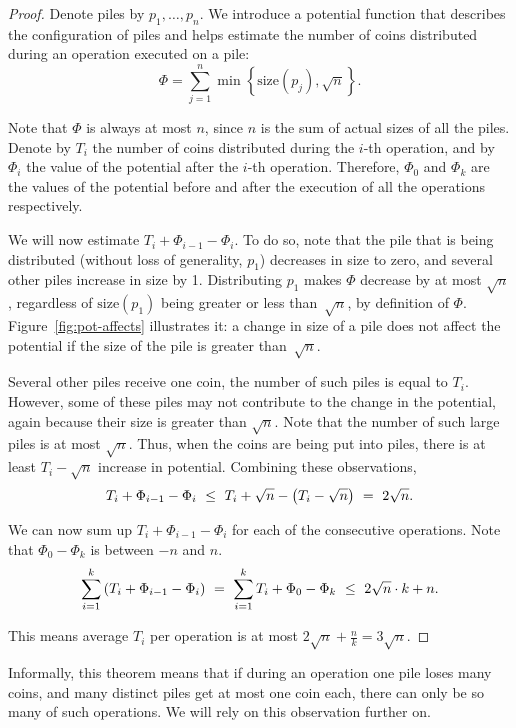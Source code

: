 \begin{proof} Denote piles by $p_1, \ldots, p_n$. We introduce a potential function that describes the configuration of piles and helps estimate the number of coins distributed during an operation executed on a pile:
	\[ \Phi = \sum\limits_{j=1}^n \min \left\{ \text{size}(p_j), \sqrt{n} \right\}. \]

Note that $\Phi$ is always at most $n$, since $n$ is the sum of actual sizes of all the piles. Denote by $T_i$ the number of coins distributed during the $i$-th operation, and by $\Phi_i$ the value of the potential after the $i$-th operation. Therefore, $\Phi_{0}$ and $\Phi_{k}$ are the values of the potential before and after the execution of all the operations respectively.

We will now estimate $T_i + \Phi_{i-1} - \Phi_i$. To do so, note that the pile that is being distributed (without loss of generality, $p_1$) decreases in size to zero, and several other piles increase in size by 1. Distributing $p_1$ makes $\Phi$ decrease by at most $\sqrt{n}$, regardless of $\text{size} (p_1)$ being greater or less than~$\sqrt{n}$, by definition of $\Phi$. Figure~\ref{fig:pot-affects} illustrates it: a change in size of a pile does not affect the potential if the size of the pile is greater than~$\sqrt{n}$.

Several other piles receive one coin, the number of such piles is equal to $T_i$. However, some of these piles may not contribute to the change in the potential, again because their size is greater than $\sqrt{n}$. Note that the number of such large piles is at most $\sqrt{n}$. Thus, when the coins are being put into piles, there is at least $T_i - \sqrt{n}$ increase in potential. Combining these observations,
	\[ T_i + \Phi_{i-1} - \Phi_i\ \le\ 
	   T_i + \sqrt{n} - \ll T_i - \sqrt{n} \rr\ =\ 2 \sqrt{n}. \]

We can now sum up $T_i + \Phi_{i-1} - \Phi_i$ for each of the consecutive operations. Note that $\Phi_0 - \Phi_k$ is between $-n$ and $n$.
	\[ \sum\limits_{i=1}^k \ll T_i + \Phi_{i-1} - \Phi_i \rr\ =\ 
	   \sum\limits_{i=1}^k T_i + \Phi_0 - \Phi_{k}\ \le\ 2\sqrt{n} \cdot k + n. \]

This means average $T_i$ per operation is at most $2\sqrt{n} + \frac{n}{k} = 3\sqrt{n}$. \end{proof}

Informally, this theorem means that if during an operation one pile
loses many coins, and many distinct piles get at most one coin each,
there can only be so many of such operations. We will rely on this
observation further on.
